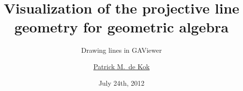 \documentclass[a4paper,11pt,twoside]{article}
\title{Visualization of the projective line geometry for geometric algebra} %
\subtitle{Drawing lines in GAViewer}
\author{\href{mailto:dhrdekok@gmail.com}{Patrick M.\ de Kok}}
\date{July 24th, 2012}
\begin{document}
\iftoggle{draft}{
\thispagestyle{empty}
\begin{tiny}
\begin{flushright}
Patrick de Kok, 5640318
\end{flushright}
\end{tiny}
  \begin{center}
    \begin{Huge}
      {\color{red} NOTE!}
    \end{Huge}
  \end{center}
  This document contains some notes. Explanation of the notes:
  \begin{itemize}
    \item \colorbox{red}{\bfseries\color{white}Red comments}: directed to the reader in general.  These include questions like how to cite, how something could be rephrased, and questions on spelling.
    \item \colorbox{yellow}{\bfseries Yellow notes}: directed at the supervisor (\makeatletter\@supervisor\makeatother) which are on the subject of the thesis.
    \item \colorbox{niceblue}{\bfseries\color{white}Blue todos}: directed mostly at myself, but might be convenient for the general reader as well.
    \item \colorbox{nicegreen}{\bfseries\color{white}Green boxes}: notes from Evi.
  \end{itemize}

Now let's start off with a question to the reader:

\comment{If putting a reference at the end of a sentence, how should that be done?}
\begin{enumerate}
  \item This is a reference to some article.~\cite{TheBook}
  \item This is a reference to some article~\cite{TheBook}.
\end{enumerate}

And a small caution:

\TODO{Fix figure and table placement.}

\TODO{Replace $X = \plucker{\V{d}}{\V{m}}$ notation with $x = \plucker{\V{x}}{\V{\bar{x}}} = \V{x}\ez + \edual{\V{\bar{x}}}$}

\TODO{Redefine $X = -\plucker{\V{d}}{\V{m}}$ to $X = \plucker{\V{d}}{\V{m}}$, if possible???}

    \setcounter{page}{-1}
  \newpage
  \thispagestyle{empty}
  \setcounter{page}{-1}
  \hspace{3cm}
  \newpage
}{}
\end{document}
